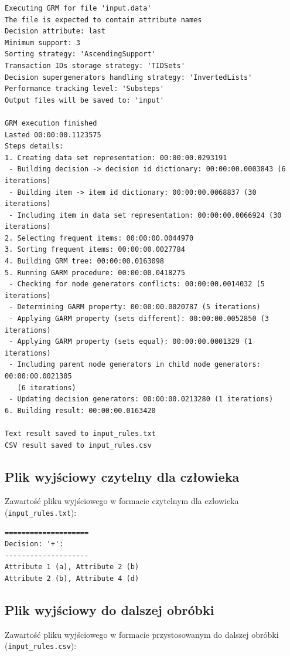 \documentclass[a4paper,10pt]{article}
\begin{document}
\begin{verbatim}
Executing GRM for file 'input.data'
The file is expected to contain attribute names
Decision attribute: last
Minimum support: 3
Sorting strategy: 'AscendingSupport'
Transaction IDs storage strategy: 'TIDSets'
Decision supergenerators handling strategy: 'InvertedLists'
Performance tracking level: 'Substeps'
Output files will be saved to: 'input'

GRM execution finished
Lasted 00:00:00.1123575
Steps details:
1. Creating data set representation: 00:00:00.0293191
 - Building decision -> decision id dictionary: 00:00:00.0003843 (6 iterations)
 - Building item -> item id dictionary: 00:00:00.0068837 (30 iterations)
 - Including item in data set representation: 00:00:00.0066924 (30 iterations)
2. Selecting frequent items: 00:00:00.0044970
3. Sorting frequent items: 00:00:00.0027784
4. Building GRM tree: 00:00:00.0163098
5. Running GARM procedure: 00:00:00.0418275
 - Checking for node generators conflicts: 00:00:00.0014032 (5 iterations)
 - Determining GARM property: 00:00:00.0020787 (5 iterations)
 - Applying GARM property (sets different): 00:00:00.0052850 (3 iterations)
 - Applying GARM property (sets equal): 00:00:00.0001329 (1 iterations)
 - Including parent node generators in child node generators: 00:00:00.0021305
   (6 iterations)
 - Updating decision generators: 00:00:00.0213280 (1 iterations)
6. Building result: 00:00:00.0163420

Text result saved to input_rules.txt
CSV result saved to input_rules.csv
\end{verbatim}


 \subsection{Plik wyjściowy czytelny dla człowieka}
 Zawartość pliku wyjściowego w formacie czytelnym dla człowieka (\verb+input_rules.txt+):

\begin{verbatim}
====================
Decision: '+':
--------------------
Attribute 1 (a), Attribute 2 (b)
Attribute 2 (b), Attribute 4 (d)
\end{verbatim}


 \subsection{Plik wyjściowy do dalszej obróbki}
 Zawartość pliku wyjściowego w formacie przystosowanym do dalszej obróbki (\verb+input_rules.csv+):
\end{document}
